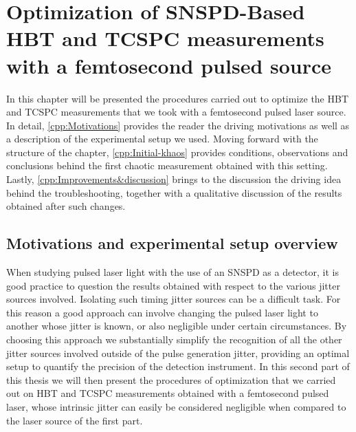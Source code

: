 \chapter{Optimization of SNSPD-Based HBT and TCSPC measurements with a femtosecond pulsed source}

In this chapter will be presented the procedures carried out to optimize the HBT and TCSPC measurements that we took with a femtosecond pulsed laser source.
In detail, \autoref{cpp:Motivations} provides the reader the driving motivations as well as a description of the experimental setup we used.
Moving forward with the structure of the chapter, \autoref{cpp:Initial-khaos} provides conditions, observations and conclusions behind the first chaotic measurement obtained with this setting.
Lastly, \autoref{cpp:Improvements&discussion} brings to the discussion the driving idea behind the troubleshooting, together with a qualitative discussion of the results obtained after such changes.



\section{Motivations and experimental setup overview}
\label{cpp:Motivations}
When studying pulsed laser light with the use of an SNSPD as a detector, it is good practice to question the results obtained with respect to the various jitter sources involved. Isolating such timing jitter sources can be a difficult task. For this reason a good approach can involve changing the pulsed laser light to another whose jitter is known, or also negligible under certain circumstances. By choosing this approach we substantially simplify the recognition of all the other jitter sources involved outside of the pulse generation jitter, providing an optimal setup to quantify the precision of the detection instrument. 
In this second part of this thesis we will then present the procedures of optimization that we carried out on HBT and TCSPC measurements obtained with a femtosecond pulsed laser, whose intrinsic jitter can easily be considered negligible when compared to the laser source of the first part.

